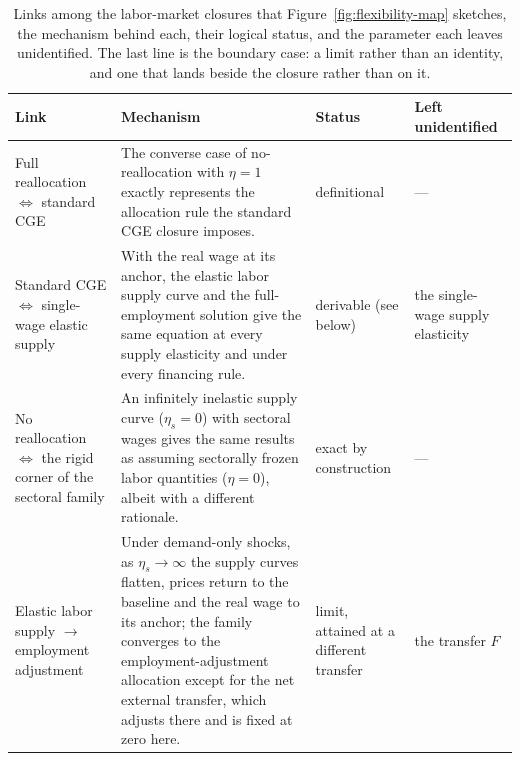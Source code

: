 \begin{table}[htbp]
\centering
\footnotesize
\setlength{\tabcolsep}{5pt}
\renewcommand{\arraystretch}{1.25}
\begin{tabular}{@{}>{\raggedright\arraybackslash}p{3.3cm}
                  >{\raggedright\arraybackslash}p{5.5cm}
                  >{\raggedright\arraybackslash}p{2.1cm}
                  >{\raggedright\arraybackslash}p{2.8cm}@{}}
\toprule
Link & Mechanism & Status & Left unidentified \\
\midrule
Full reallocation $\Leftrightarrow$ standard CGE
& The converse case of no-reallocation with $\eta = 1$ exactly represents the allocation rule the standard CGE closure imposes.
& definitional
& ---  \\[3pt]
Standard CGE $\Leftrightarrow$ single-wage elastic supply
& With the real wage at its anchor, the elastic labor supply curve and the full-employment solution give the same equation at every supply elasticity and under every financing rule.
& derivable (see below)
& the single-wage supply elasticity \\[3pt]
No reallocation $\Leftrightarrow$ the rigid corner of the sectoral family
& An infinitely inelastic supply curve ($\eta_s=0$) with sectoral wages gives the same results as assuming sectorally frozen labor quantities ($\eta=0$), albeit with a different rationale.
& exact by construction
& ---  \\[3pt]
Elastic labor supply $\rightarrow$ employment adjustment
& Under demand-only shocks, as $\eta_s\to\infty$ the supply curves flatten, prices return to the baseline and the real wage to its anchor; the family converges to the employment-adjustment allocation except for the net external transfer, which adjusts there and is fixed at zero here.
& limit, attained at a different transfer
& the transfer $F$ \\
\bottomrule
\end{tabular}
\caption{Links among the labor-market closures that Figure~\ref{fig:flexibility-map} sketches, the mechanism behind each, their
logical status, and the parameter each leaves unidentified. The last line is
the boundary case: a limit rather than an identity, and one that lands beside
the closure rather than on it.}
\label{tab:equiv-links}
\end{table}
